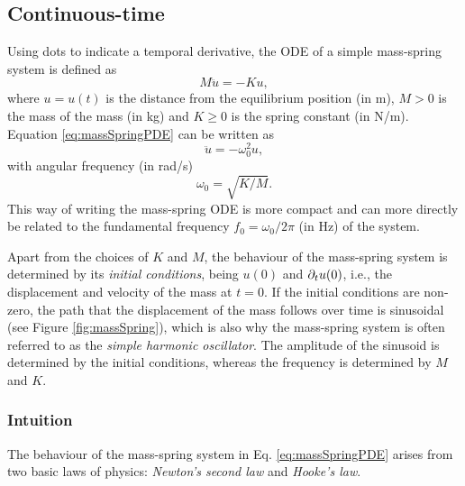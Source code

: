 \subsection{Continuous-time}\label{sec:massSpringCont}
Using dots to indicate a temporal derivative, the ODE of a simple mass-spring system is defined as
\begin{equation}\label{eq:massSpringPDE}
    M\ddot u = -Ku,
\end{equation}
where $u = u(t)$ is the distance from the equilibrium position (in m), $M>0$ is the mass of the mass (in kg) and $K\geq 0$ is the spring constant (in N/m). Equation \eqref{eq:massSpringPDE} can be written as
\begin{equation}\label{eq:massSpringCompact}
    \ddot u = -\omega_0^2u,
\end{equation}
with angular frequency (in rad/s)
\begin{equation}\label{eq:omega0MassSpring}
    \omega_0 = \sqrt{K/M}.
\end{equation}
This way of writing the mass-spring ODE is more compact and can more directly be related to the fundamental frequency $f_0 = \omega_0 / 2 \pi$ (in Hz) of the system. 

Apart from the choices of $K$ and $M$, the behaviour of the mass-spring system is determined by its \textit{initial conditions}, being $u(0)$ and $\partial_t u(0)$, i.e., the displacement and velocity of the mass at $t = 0$. If the initial conditions are non-zero, the path that the displacement of the mass follows over time is sinusoidal (see Figure \ref{fig:massSpring}), which is also why the mass-spring system is often referred to as the \textit{simple harmonic oscillator}. The amplitude of the sinusoid is determined by the initial conditions, whereas the frequency is determined by $M$ and $K$. 



\subsubsection{Intuition}
The behaviour of the mass-spring system in Eq. \eqref{eq:massSpringPDE} arises from two basic laws of physics: \textit{Newton's second law} and \textit{Hooke's law}. 

